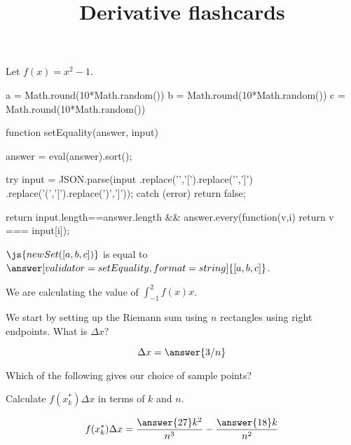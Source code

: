 \documentclass{ximera}
\title{Derivative flashcards}
\begin{document}
\begin{exercise}
Let $f(x) = x^2-1$.

\begin{javascript}
  a = Math.round(10*Math.random())
  b = Math.round(10*Math.random())
  c = Math.round(10*Math.random())  

  function setEquality(answer, input) {
    answer = eval(answer).sort();
    
    try {
      input = JSON.parse(input
        .replace('{','[').replace('}',']')
        .replace('(','[').replace(')',']'));
    } catch (error) {
      return false;
    }
    
     return input.length==answer.length &&
       answer.every(function(v,i) { return v === input[i]});
   }

\end{javascript}

\begin{problem}
  $\js{new Set([a,b,c])}$ is equal to $\answer[validator=setEquality,format=string]{[a,b,c]}$.
\end{problem}

We are calculating the value of $\displaystyle \int_{-1}^{2} f(x)  x$.
 

We start by setting up the Riemann sum using $n$ rectangles using right endpoints.
What is $\Delta x$?
     
\[ \Delta x = \answer{3/n} \]

\begin{exercise}
  Which of the following gives our choice of sample points?
  \begin{multipleChoice}
  \end{multipleChoice}
  
  \begin{exercise}
    Calculate $f(x_k^*) \Delta x$ in terms of $k$ and $n$.
    
    \[ f(x_k^*) \Delta x = \frac{\answer{27}k^2}{n^3}-\frac{\answer{18}k}{n^2} \]
  \end{exercise}
\end{exercise}
\end{exercise}
\end{document}
